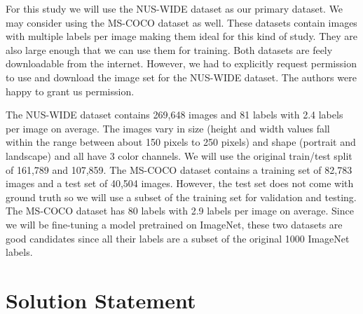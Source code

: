 \documentclass[10pt, a4paper, twocolumn]{article} %
\begin{document}

For this study we will use the NUS-WIDE\citep{nus-wide-civr09} dataset as our primary dataset. We may consider using the MS-COCO\citep{MSCOCO} dataset as well.  
These datasets contain images with multiple labels per image making them ideal for this kind of study.
They are also large enough that we can use them for training.
Both datasets are feely downloadable from the internet.  However, we had to explicitly request permission to use and download the image set for the NUS-WIDE dataset.  The authors were happy to grant us permission.

The NUS-WIDE dataset contains 269,648 images and 81 labels with 2.4 labels per image on average.  The images vary in size (height and width values fall within the range between about 150 pixels to 250 pixels) and shape (portrait and landscape) and all have 3 color channels. We will use the original train/test split of 161,789 and 107,859. The MS-COCO dataset contains a training set of 82,783 images and a test set of 40,504 images.  However, the test set does not come with ground truth so we will use a subset of the training set for validation and testing. The MS-COCO dataset has 80 labels with 2.9 labels per image on average.  
Since we will be fine-tuning a model pretrained on ImageNet, these two datasets are good candidates since all their labels are a subset of the original 1000 ImageNet labels.

\section{Solution Statement}\label{sec:4} %

\end{document}
